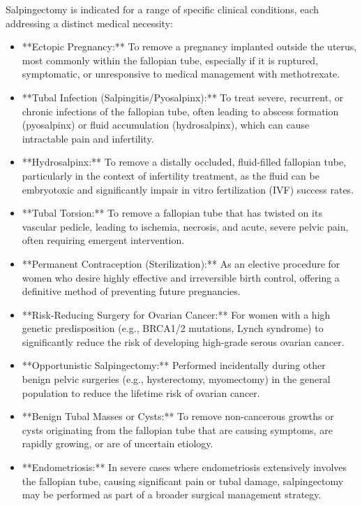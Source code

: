 Salpingectomy is indicated for a range of specific clinical conditions, each addressing a distinct medical necessity:

\begin{itemize}
  \item **Ectopic Pregnancy:** To remove a pregnancy implanted outside the uterus, most commonly within the fallopian tube, especially if it is ruptured, symptomatic, or unresponsive to medical management with methotrexate.
  \item **Tubal Infection (Salpingitis/Pyosalpinx):** To treat severe, recurrent, or chronic infections of the fallopian tube, often leading to abscess formation (pyosalpinx) or fluid accumulation (hydrosalpinx), which can cause intractable pain and infertility.
  \item **Hydrosalpinx:** To remove a distally occluded, fluid-filled fallopian tube, particularly in the context of infertility treatment, as the fluid can be embryotoxic and significantly impair in vitro fertilization (IVF) success rates.
  \item **Tubal Torsion:** To remove a fallopian tube that has twisted on its vascular pedicle, leading to ischemia, necrosis, and acute, severe pelvic pain, often requiring emergent intervention.
  \item **Permanent Contraception (Sterilization):** As an elective procedure for women who desire highly effective and irreversible birth control, offering a definitive method of preventing future pregnancies.
  \item **Risk-Reducing Surgery for Ovarian Cancer:** For women with a high genetic predisposition (e.g., BRCA1/2 mutations, Lynch syndrome) to significantly reduce the risk of developing high-grade serous ovarian cancer.
  \item **Opportunistic Salpingectomy:** Performed incidentally during other benign pelvic surgeries (e.g., hysterectomy, myomectomy) in the general population to reduce the lifetime risk of ovarian cancer.
  \item **Benign Tubal Masses or Cysts:** To remove non-cancerous growths or cysts originating from the fallopian tube that are causing symptoms, are rapidly growing, or are of uncertain etiology.
  \item **Endometriosis:** In severe cases where endometriosis extensively involves the fallopian tube, causing significant pain or tubal damage, salpingectomy may be performed as part of a broader surgical management strategy.
\end{itemize}

